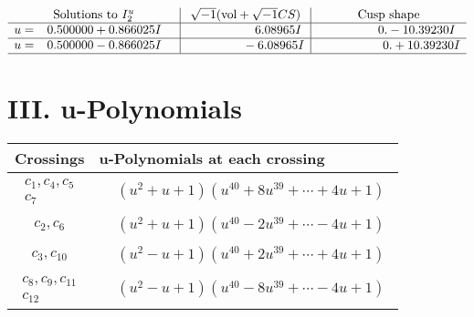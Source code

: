 \documentclass[1p]{elsarticle_modified}
\theoremstyle{definition}
\newcommand{\I}{\sqrt{-1}}
\begin{document}
$$\begin{array}{c|c|c}  
\text{Solutions to }I^u_{2}& \I (\text{vol} + \sqrt{-1}CS) & \text{Cusp shape}\\
 \hline 
\begin{aligned}
u &= \phantom{-}0.500000 + 0.866025 I\end{aligned}
 & \phantom{-0.000000 -}6.08965 I & \phantom{-0.000000 } 0. - 10.39230 I \\ \hline\begin{aligned}
u &= \phantom{-}0.500000 - 0.866025 I\end{aligned}
 & \phantom{-0.000000 } -6.08965 I & \phantom{-0.000000 -}0. + 10.39230 I\\
 \hline 
 \end{array}$$\newpage
\newpage\renewcommand{\arraystretch}{1}
\centering \section*{ III. u-Polynomials}
\begin{tabular}{m{50pt}|m{274pt}}
Crossings & \hspace{64pt}u-Polynomials at each crossing \\
\hline $$\begin{aligned}c_{1},c_{4},c_{5}\\c_{7}\end{aligned}$$&$\begin{aligned}
&(u^2+u+1)(u^{40}+8 u^{39}+\cdots+4 u+1)
\end{aligned}$\\
\hline $$\begin{aligned}c_{2},c_{6}\end{aligned}$$&$\begin{aligned}
&(u^2+u+1)(u^{40}-2 u^{39}+\cdots-4 u+1)
\end{aligned}$\\
\hline $$\begin{aligned}c_{3},c_{10}\end{aligned}$$&$\begin{aligned}
&(u^2- u+1)(u^{40}+2 u^{39}+\cdots+4 u+1)
\end{aligned}$\\
\hline $$\begin{aligned}c_{8},c_{9},c_{11}\\c_{12}\end{aligned}$$&$\begin{aligned}
&(u^2- u+1)(u^{40}-8 u^{39}+\cdots-4 u+1)
\end{aligned}$\\
\hline
\end{tabular}\newpage\renewcommand{\arraystretch}{1}
\end{document}
